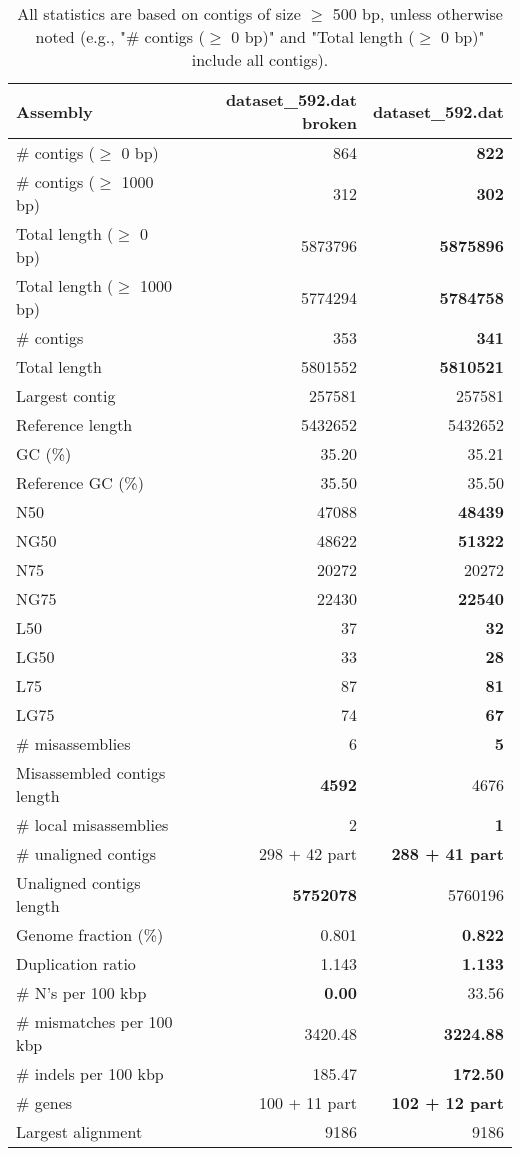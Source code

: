 \documentclass[12pt,a4paper]{article}
\begin{document}
\begin{table}[ht]
\begin{center}
\caption{All statistics are based on contigs of size $\geq$ 500 bp, unless otherwise noted (e.g., "\# contigs ($\geq$ 0 bp)" and "Total length ($\geq$ 0 bp)" include all contigs).}
\begin{tabular}{|l*{2}{|r}|}
\hline
Assembly & dataset\_592.dat broken & dataset\_592.dat \\ \hline
\# contigs ($\geq$ 0 bp) & 864 & {\bf 822} \\ \hline
\# contigs ($\geq$ 1000 bp) & 312 & {\bf 302} \\ \hline
Total length ($\geq$ 0 bp) & 5873796 & {\bf 5875896} \\ \hline
Total length ($\geq$ 1000 bp) & 5774294 & {\bf 5784758} \\ \hline
\# contigs & 353 & {\bf 341} \\ \hline
Total length & 5801552 & {\bf 5810521} \\ \hline
Largest contig & 257581 & 257581 \\ \hline
Reference length & 5432652 & 5432652 \\ \hline
GC (\%) & 35.20 & 35.21 \\ \hline
Reference GC (\%) & 35.50 & 35.50 \\ \hline
N50 & 47088 & {\bf 48439} \\ \hline
NG50 & 48622 & {\bf 51322} \\ \hline
N75 & 20272 & 20272 \\ \hline
NG75 & 22430 & {\bf 22540} \\ \hline
L50 & 37 & {\bf 32} \\ \hline
LG50 & 33 & {\bf 28} \\ \hline
L75 & 87 & {\bf 81} \\ \hline
LG75 & 74 & {\bf 67} \\ \hline
\# misassemblies & 6 & {\bf 5} \\ \hline
Misassembled contigs length & {\bf 4592} & 4676 \\ \hline
\# local misassemblies & 2 & {\bf 1} \\ \hline
\# unaligned contigs & 298 + 42 part & {\bf 288 + 41 part} \\ \hline
Unaligned contigs length & {\bf 5752078} & 5760196 \\ \hline
Genome fraction (\%) & 0.801 & {\bf 0.822} \\ \hline
Duplication ratio & 1.143 & {\bf 1.133} \\ \hline
\# N's per 100 kbp & {\bf 0.00} & 33.56 \\ \hline
\# mismatches per 100 kbp & 3420.48 & {\bf 3224.88} \\ \hline
\# indels per 100 kbp & 185.47 & {\bf 172.50} \\ \hline
\# genes & 100 + 11 part & {\bf 102 + 12 part} \\ \hline
Largest alignment & 9186 & 9186 \\ \hline
\end{tabular}
\end{center}
\end{table}
\end{document}
